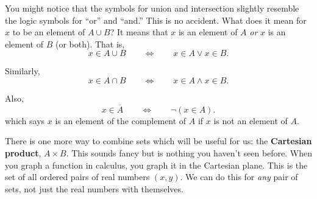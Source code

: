 \documentclass[10pt,]{book}
\newcommand{\terminology}[1]{\textbf{#1}}
\theoremstyle{plain}
\theoremstyle{definition}
\theoremstyle{definition}
\theoremstyle{definition}
\numberwithin{equation}{section}
\def\Iff{\Leftrightarrow}
\renewcommand{\bar}{\overline}
\begin{document}
      You might notice that the symbols for union and intersection slightly resemble the logic symbols for ``or'' and ``and.'' This is no accident. What does it mean for \(x\) to be an element of \(A\cup B\)? It means that \(x\) is an element of \(A\) \emph{or} \(x\) is an element of \(B\) (or both). That is,
      \begin{equation*}
        x \in A \cup B \qquad \Iff \qquad x \in A \vee x \in B.
      \end{equation*}
\par

      Similarly,
      \begin{equation*}
        x \in A \cap B \qquad \Iff \qquad x \in A \wedge x \in B.
      \end{equation*}
\par

      Also,
      \begin{equation*}
        x \in \bar A \qquad \Iff \qquad \neg (x \in A).
      \end{equation*}
      which says \(x\) is an element of the complement of \(A\) if \(x\) is not an element of \(A\).
\par

      There is one more way to combine sets which will be useful for us: the \terminology{Cartesian product}, \(A \times B\). This sounds fancy but is nothing you haven't seen before. When you graph a function in calculus, you graph it in the Cartesian plane. This is the set of all ordered pairs of real numbers \((x,y)\). We can do this for \emph{any} pair of sets, not just the real numbers with themselves.
\par
\end{document}
